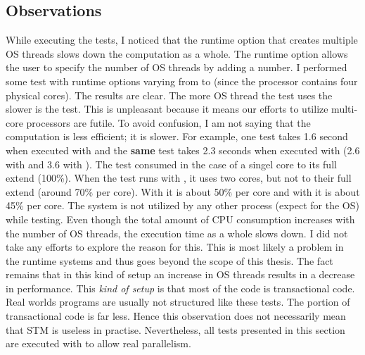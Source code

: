 \subsection{Observations}
While executing the tests, I noticed that the runtime option  that creates multiple OS threads slows down the 
computation as a whole. The runtime option  allows the user to specify the number of OS threads by adding a 
number. I performed some test with runtime options varying from  to  (since the processor contains four 
physical cores). The results are clear. The more OS thread the test uses the slower is the test. This is unpleasant 
because it means our efforts to utilize multi-core processors are futile. To avoid confusion, I am not saying that 
the computation is less efficient; it is slower. For example, one test takes 1.6 second when executed with 
and the \textbf{same} test takes 2.3 seconds when executed with  (2.6 with  and 3.6 with ).
The test consumed in the case of  a singel core to its full extend (100\%). When the test runs with ,
it uses two cores, but not to their full extend (around 70\% per core). With  it is about 50\% per core and 
with  it is about 45\% per core. The system is not utilized by any other process (expect for the OS) while
testing. Even though the total amount of CPU consumption increases with the number of OS threads, the execution time 
as a whole slows down. I did not take any efforts to explore the reason for this. This is most likely a problem 
in the runtime systems and thus goes beyond the scope of this thesis. The fact remains that in this kind of
setup an increase in OS threads results in a decrease in performance. This \textit{kind of setup} is that most of 
the code is transactional code. Real worlds programs are usually not structured like these tests. The portion
of transactional code is far less. Hence this observation does not necessarily mean that STM is useless in 
practise. Nevertheless, all tests presented in this section are executed with  to allow real parallelism. 

